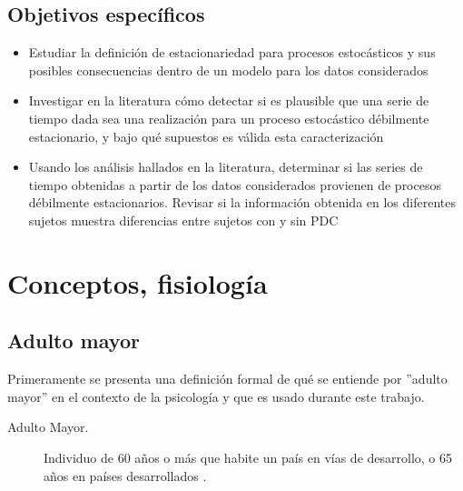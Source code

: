 \documentclass[12pt,a4paper]{mitthesis}
\begin{document}

\subsection{Objetivos espec\'ificos}

\begin{itemize}
\item Estudiar la definici\'on de estacionariedad para procesos estoc\'asticos y sus posibles 
consecuencias dentro de un modelo para los datos considerados

\item Investigar en la literatura c\'omo detectar si es plausible que una serie de tiempo dada sea 
una realizaci\'on para un proceso estoc\'astico d\'ebilmente estacionario, y bajo qu\'e supuestos 
es v\'alida esta caracterizaci\'on

\item Usando los an\'alisis hallados en la literatura, determinar si las series de tiempo 
obtenidas a partir de los datos considerados provienen de procesos débilmente estacionarios.
Revisar si la informaci\'on obtenida en los diferentes sujetos muestra diferencias entre sujetos 
con y sin PDC
\end{itemize}


\section{Conceptos, fisiolog\'ia}

\subsection{Adulto mayor}

Primeramente se presenta una definici\'on formal de qu\'e se entiende por ''adulto mayor'' en el 
contexto de la psicolog\'ia y que es usado durante este trabajo.

\begin{description}
\item[Adulto Mayor.] Individuo de 60 a\~nos o m\'as que habite un pa\'is en v\'ias de desarrollo, o 
65 a\~nos en pa\'ises desarrollados \cite{Hita14}.
\end{description}
\end{document}
